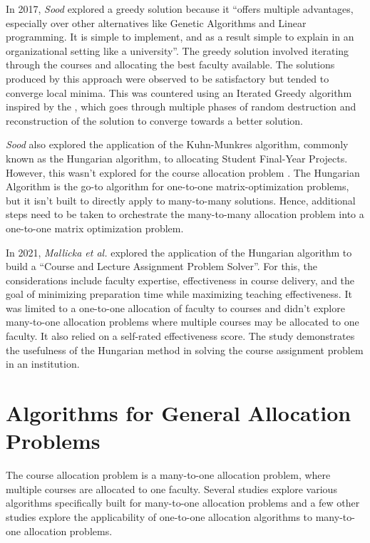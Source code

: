In 2017, \textit{Sood} \cite{rohan2017} explored a greedy solution because it ``offers multiple advantages, especially over other alternatives like Genetic Algorithms and Linear programming. It is simple to implement, and as a result simple to explain in an organizational setting like a university''. The greedy solution involved iterating through the courses and allocating the best faculty available. The solutions produced by this approach were observed to be satisfactory but tended to converge local minima. This was countered using an Iterated Greedy algorithm inspired by the \cite{ruiz2007simple}, which goes through multiple phases of random destruction and reconstruction of the solution to converge towards a better solution.

\textit{Sood} also explored the application of the Kuhn-Munkres algorithm, commonly known as the Hungarian algorithm, to allocating Student Final-Year Projects. However, this wasn't explored for the course allocation problem \cite{rohan2017}. The Hungarian Algorithm \cite{munkres1957algorithms} is the go-to algorithm for one-to-one matrix-optimization problems, but it isn't built to directly apply to many-to-many solutions. Hence, additional steps need to be taken to orchestrate the many-to-many allocation problem into a one-to-one matrix optimization problem.

In 2021, \textit{Mallicka et al.} \cite{mallicka2021claps} explored the application of the Hungarian algorithm to build a ``Course and Lecture Assignment Problem Solver''. For this, the considerations include faculty expertise, effectiveness in course delivery, and the goal of minimizing preparation time while maximizing teaching effectiveness. It was limited to a one-to-one allocation of faculty to courses and didn't explore many-to-one allocation problems where multiple courses may be allocated to one faculty. It also relied on a self-rated effectiveness score. The study demonstrates the usefulness of the Hungarian method in solving the course assignment problem in an institution.

\section{Algorithms for General Allocation Problems}

The course allocation problem is a many-to-one allocation problem, where multiple courses are allocated to one faculty. Several studies explore various algorithms specifically built for many-to-one allocation problems and a few other studies explore the applicability of one-to-one allocation algorithms to many-to-one allocation problems.

